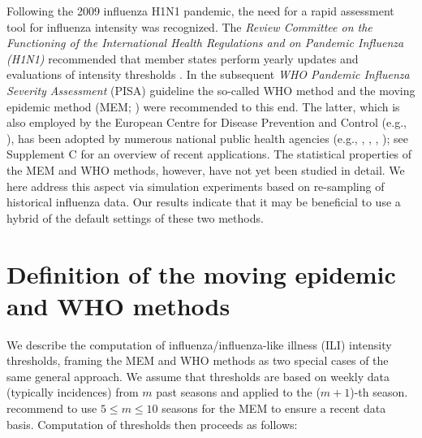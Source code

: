 \documentclass{article}
\begin{document}
Following the 2009 influenza H1N1 pandemic, the need for a rapid assessment tool for influenza intensity was recognized. The \textit{Review Committee on the Functioning of the
International Health Regulations and on Pandemic Influenza (H1N1)} recommended that member states perform yearly updates and evaluations of intensity thresholds \citep[p.118]{WHO2011}. In the subsequent \textit{WHO Pandemic Influenza Severity Assessment} (PISA) guideline \citep{WHO2017} the so-called WHO method \citep{WHO2014} and the moving epidemic method (MEM; \citealt{Vega2013, Vega2015}) were recommended to this end. The latter, which is also employed by the European Centre for Disease Prevention and Control (e.g., \citealt{ECDC2017}), has been adopted by numerous national public health agencies (e.g., \citealt{Dahlgren2019}, \citealt{Rakocevic2019}, \citealt{RedondoBravo2020}, \citealt{Vos2019}); see Supplement C for an overview of recent applications. The statistical properties of the MEM and WHO methods, however, have not yet been studied in detail. We here address this aspect via simulation experiments based on re-sampling of historical influenza data. Our results indicate that it may be beneficial to use a hybrid of the default settings of these two methods.%


\section{Definition of the moving epidemic and WHO methods}
\label{sec:definitions}

We describe the computation of influenza/influenza-like illness (ILI) intensity thresholds, framing the MEM and WHO methods as two special cases of the same general approach. We assume that thresholds are based on weekly data (typically incidences) from $m$ past seasons and applied to the ($m + 1$)-th season. \cite{Vega2015} recommend to use $5 \leq m \leq 10$ seasons for the MEM to ensure a recent data basis. Computation of thresholds then proceeds as follows:
\end{document}

